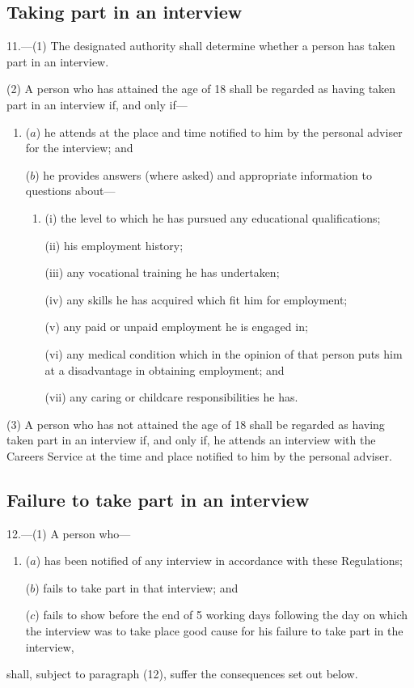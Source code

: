 \documentclass[12pt,a4paper]{article}
\begin{document}
\subsection[11. Taking part in an interview]{Taking part in an interview}

11.---(1)  The designated authority shall determine whether a person has taken part in an interview.

(2) A person who has attained the age of 18 shall be regarded as having taken part in an interview if, and only if—
\begin{enumerate}\item[]
($a$) he attends at the place and time notified to him by the personal adviser for the interview; and

($b$) he provides answers (where asked) and appropriate information to questions about—
\begin{enumerate}\item[]
(i) the level to which he has pursued any educational qualifications;

(ii) his employment history;

(iii) any vocational training he has undertaken;

(iv) any skills he has acquired which fit him for employment;

(v) any paid or unpaid employment he is engaged in;

(vi) any medical condition which in the opinion of that person puts him at a disadvantage in obtaining employment; and

(vii) any caring or childcare responsibilities he has.
\end{enumerate}
\end{enumerate}

(3) A person who has not attained the age of 18 shall be regarded as having taken part in an interview if, and only if, he attends an interview with the Careers Service at the time and place notified to him by the personal adviser.

\subsection[12. Failure to take part in an interview]{Failure to take part in an interview}

12.---(1)  A person who—
\begin{enumerate}\item[]
($a$) has been notified of any interview in accordance with these Regulations;

($b$) fails to take part in that interview; and

($c$) fails to show before the end of 5 working days following the day on which the interview was to take place good cause for his failure to take part in the interview,
\end{enumerate}
shall, subject to paragraph (12), suffer the consequences set out below.
\end{document}
